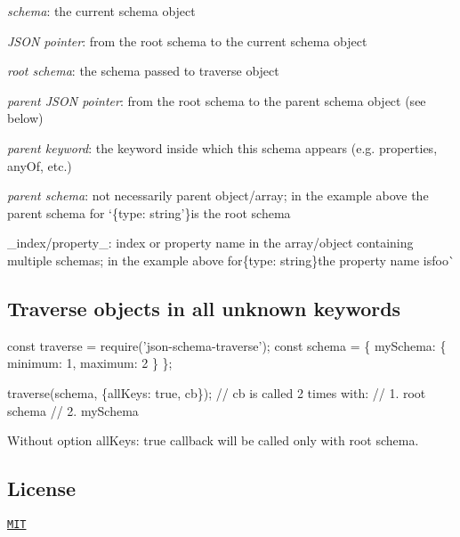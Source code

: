 \begin{DoxyItemize}
\item {\itshape schema}\+: the current schema object
\item {\itshape J\+S\+ON pointer}\+: from the root schema to the current schema object
\item {\itshape root schema}\+: the schema passed to {\ttfamily traverse} object
\item {\itshape parent J\+S\+ON pointer}\+: from the root schema to the parent schema object (see below)
\item {\itshape parent keyword}\+: the keyword inside which this schema appears (e.\+g. {\ttfamily properties}, {\ttfamily any\+Of}, etc.)
\item {\itshape parent schema}\+: not necessarily parent object/array; in the example above the parent schema for `\{type\+: \textquotesingle{}string'\}{\ttfamily is the root schema}
\item {\ttfamily \+\_\+index/property\+\_\+\+: index or property name in the array/object containing multiple schemas; in the example above for}\{type\+: \textquotesingle{}string\textquotesingle{}\}{\ttfamily the property name is}\textquotesingle{}foo\textquotesingle{}\`{}
\end{DoxyItemize}

\subsection*{Traverse objects in all unknown keywords}


\begin{DoxyCode}
const traverse = require('json-schema-traverse');
const schema = \{
  mySchema: \{
    minimum: 1,
    maximum: 2
  \}
\};

traverse(schema, \{allKeys: true, cb\});
// cb is called 2 times with:
// 1. root schema
// 2. mySchema
\end{DoxyCode}


Without option {\ttfamily all\+Keys\+: true} callback will be called only with root schema.

\subsection*{License}

\href{https://github.com/epoberezkin/json-schema-traverse/blob/master/LICENSE}{\tt M\+IT} 